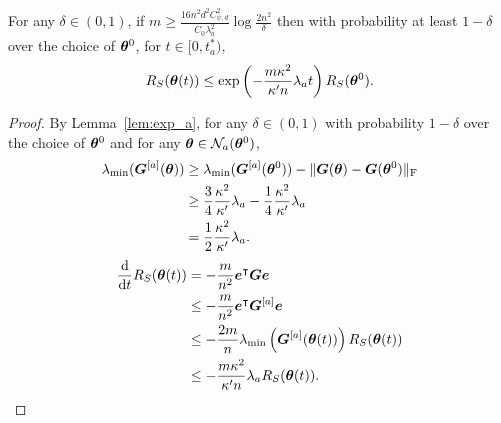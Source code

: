 \documentclass{article}
\begin{document}
\begin{prop}
    For any $\delta\in(0,1)$, if $m\geq\frac{16n^2d^2C_{\psi,d}^2}{C_0\lambda_a^2}\log\frac{2n^2}{\delta}$ then with probability at least $1-\delta$ over the choice of $\bm{\theta}^0$, for $t\in[0,t^*_a)$,
    \begin{equation}
        R_S(\bm{\theta}(t))\leq\exp\left(-\frac{m\kappa^2}{\kappa'n}\lambda_at\right)R_S(\bm{\theta}^0).
    \end{equation}
\end{prop}
\begin{proof}
    By Lemma~\ref{lem:exp_a}, for any $\delta\in(0,1)$ with probability $1-\delta$ over the choice of $\bm{\theta}^0$ and for any $\bm{\theta}\in\mathcal{N}_a(\bm{\theta}^0)$,
    \begin{equation}
        \begin{aligned}
            \lambda_{\min}(\bm{G}^{[a]}(\bm{\theta}))
             & \geq\lambda_{\min}(\bm{G}^{[a]}(\bm{\theta}^0))-\lVert\bm{G}(\bm{\theta})-\bm{G}(\bm{\theta}^0)\rVert_\mathrm{F} \\
             & \geq \frac{3}{4}\frac{\kappa^2}{\kappa'}\lambda_a-\frac{1}{4}\frac{\kappa^2}{\kappa'}\lambda_a   \\
             & = \frac{1}{2}\frac{\kappa^2}{\kappa'}\lambda_a.
        \end{aligned}
    \end{equation}
    \begin{equation}
        \begin{aligned}
            \frac{\mathrm{d}}{\mathrm{d} t}R_S(\bm{\theta}(t))
             & = -\frac{m}{n^2}\bm{e}^{\intercal}\bm{G}\bm{e}                                                          \\
             & \leq -\frac{m}{n^2}\bm{e}^{\intercal}\bm{G}^{[a]}\bm{e}                                                 \\
             & \leq -\frac{2m}{n}\lambda_{\min}\left(\bm{G}^{[a]}(\bm{\theta}(t))\right)R_S(\bm{\theta}(t)) \\
             & \leq -\frac{m\kappa^2}{\kappa'n}\lambda_aR_S(\bm{\theta}(t)).
        \end{aligned}
    \end{equation}
\end{proof}
\end{document}
